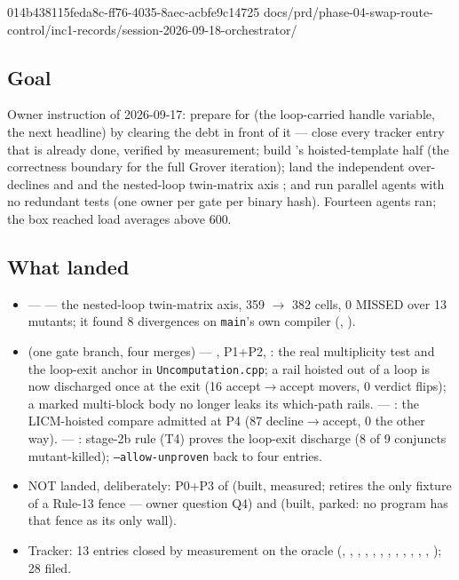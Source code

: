 %
  {014b4381}{15feda8c-ff76-4035-8aec-acbfe9c14725}%
  {docs/prd/phase-04-swap-route-control/inc1-records/session-2026-09-18-orchestrator/}

\subsection*{Goal}
Owner instruction of 2026-09-17: prepare for  (the loop-carried handle variable, the next
headline) by clearing the debt in front of it --- close every tracker entry that is already done,
verified by measurement; build 's hoisted-template half (the correctness boundary for the full
Grover iteration); land the independent over-declines  and  and the nested-loop
twin-matrix axis ; and run parallel agents with no redundant tests (one owner per gate per
binary hash). Fourteen agents ran; the box reached load averages above 600.

\subsection*{What landed}
\begin{itemize}
  \item {} ---  --- the nested-loop twin-matrix axis, 359 $\rightarrow$ 382
        cells, 0 MISSED over 13 mutants; it found 8 divergences on \texttt{main}'s own compiler
        (, ).
  \item {} (one gate branch, four merges) --- ,  P1+P2, :
        the real multiplicity test and the loop-exit anchor in \texttt{Uncomputation.cpp}; a rail
        hoisted out of a loop is now discharged once at the exit (16 accept$\rightarrow$accept movers,
        0 verdict flips); a marked multi-block body no longer leaks its which-path rails. ---
        : the LICM-hoisted compare admitted at P4 (87 decline$\rightarrow$accept, 0 the
        other way). --- : stage-2b rule (T4) proves the loop-exit discharge (8 of 9 conjuncts
        mutant-killed); \texttt{--allow-unproven} back to four entries.
  \item NOT landed, deliberately: P0+P3 of  (built, measured; retires the only fixture of a
        Rule-13 fence --- owner question Q4) and  (built, parked: no program has that fence as
        its only wall).
  \item Tracker: 13 entries closed by measurement on the oracle (, , ,
        , , , , , , , ,
        , ); 28 filed.
\end{itemize}

